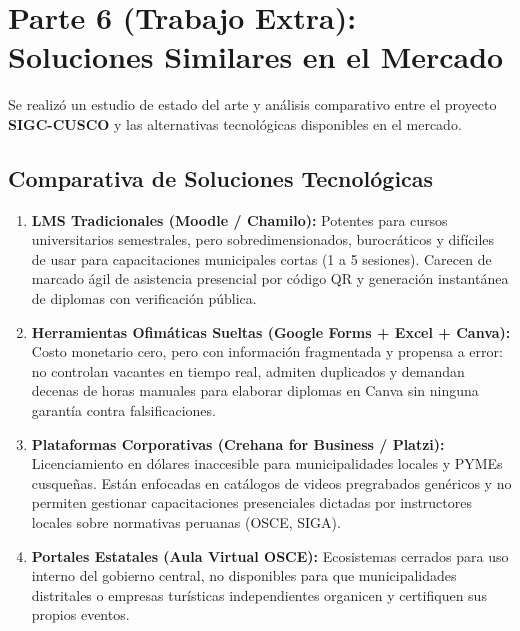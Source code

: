 
\section{Parte 6 (Trabajo Extra): Soluciones Similares en el Mercado}

Se realizó un estudio de estado del arte y análisis comparativo entre el proyecto \textbf{SIGC-CUSCO} y las alternativas tecnológicas disponibles en el mercado.

\subsection{Comparativa de Soluciones Tecnológicas}

\begin{enumerate}\setlength\itemsep{0.2em}
    \item \textbf{LMS Tradicionales (Moodle / Chamilo):} Potentes para cursos universitarios semestrales, pero sobredimensionados, burocráticos y difíciles de usar para capacitaciones municipales cortas (1 a 5 sesiones). Carecen de marcado ágil de asistencia presencial por código QR y generación instantánea de diplomas con verificación pública.
    \item \textbf{Herramientas Ofimáticas Sueltas (Google Forms + Excel + Canva):} Costo monetario cero, pero con información fragmentada y propensa a error: no controlan vacantes en tiempo real, admiten duplicados y demandan decenas de horas manuales para elaborar diplomas en Canva sin ninguna garantía contra falsificaciones.
    \item \textbf{Plataformas Corporativas (Crehana for Business / Platzi):} Licenciamiento en dólares inaccesible para municipalidades locales y PYMEs cusqueñas. Están enfocadas en catálogos de videos pregrabados genéricos y no permiten gestionar capacitaciones presenciales dictadas por instructores locales sobre normativas peruanas (OSCE, SIGA).
    \item \textbf{Portales Estatales (Aula Virtual OSCE):} Ecosistemas cerrados para uso interno del gobierno central, no disponibles para que municipalidades distritales o empresas turísticas independientes organicen y certifiquen sus propios eventos.
\end{enumerate}

